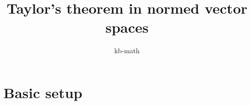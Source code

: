 \documentclass[twoside, a4paper, 10pt]{amsart}
\title[ ]{Taylor's theorem in normed vector spaces}
\author{kb-math}
\begin{document}
\maketitle
\raggedbottom

\tableofcontents


\newcommand{\cA}{\mathcal{A}}
\newcommand{\cB}{\mathcal{B}}
\newcommand{\cC}{\mathcal{C}}
\newcommand{\cD}{\mathcal{D}}
\newcommand{\cE}{\mathcal{E}}
\newcommand{\cF}{\mathcal{F}}
\newcommand{\cG}{\mathcal{G}}
\newcommand{\cH}{\mathcal{H}}
\newcommand{\cI}{\mathcal{I}}
\newcommand{\cJ}{\mathcal{J}}
\newcommand{\cK}{\mathcal{K}}
\newcommand{\cL}{\mathcal{L}}
\newcommand{\cM}{\mathcal{M}}
\newcommand{\cN}{\mathcal{N}}
\newcommand{\cO}{\mathcal{O}}
\newcommand{\cP}{\mathcal{P}}
\newcommand{\cQ}{\mathcal{Q}}
\newcommand{\cR}{\mathcal{R}}
\newcommand{\cS}{\mathcal{S}}
\newcommand{\cT}{\mathcal{T}}
\newcommand{\cU}{\mathcal{U}}
\newcommand{\cV}{\mathcal{V}}
\newcommand{\cW}{\mathcal{W}}
\newcommand{\cX}{\mathcal{X}}
\newcommand{\cY}{\mathcal{Y}}
\newcommand{\cZ}{\mathcal{Z}}
\newcommand{\bA}{\mathbb{A}}
\newcommand{\bB}{\mathbb{B}}
\newcommand{\bC}{\mathbb{C}}
\newcommand{\bD}{\mathbb{D}}
\newcommand{\bE}{\mathbb{E}}
\newcommand{\bF}{\mathbb{F}}
\newcommand{\bG}{\mathbb{G}}
\newcommand{\bH}{\mathbb{H}}
\newcommand{\bI}{\mathbb{I}}
\newcommand{\bJ}{\mathbb{J}}
\newcommand{\bK}{\mathbb{K}}
\newcommand{\bL}{\mathbb{L}}
\newcommand{\bM}{\mathbb{M}}
\newcommand{\bN}{\mathbb{N}}
\newcommand{\bO}{\mathbb{O}}
\newcommand{\bP}{\mathbb{P}}
\newcommand{\bQ}{\mathbb{Q}}
\newcommand{\bR}{\mathbb{R}}
\newcommand{\bS}{\mathbb{S}}
\newcommand{\bT}{\mathbb{T}}
\newcommand{\bU}{\mathbb{U}}
\newcommand{\bV}{\mathbb{V}}
\newcommand{\bW}{\mathbb{W}}
\newcommand{\bX}{\mathbb{X}}
\newcommand{\bY}{\mathbb{Y}}
\newcommand{\bZ}{\mathbb{Z}}


 

\theoremstyle{definition}
\newtheorem{mydef}[dummy]{Definition}
\newtheorem{prop}[dummy]{Proposition}
\newtheorem{corol}[dummy]{Corollary}
\newtheorem{thm}[dummy]{Theorem}
\newtheorem{lemma}[dummy]{Lemma}
\newtheorem{eg}[dummy]{Example}
\newtheorem{notation}[dummy]{Notation}
\newtheorem{remark}[dummy]{Remark}
\newtheorem{claim}[dummy]{Claim}
\newtheorem{Exercise}[dummy]{Exercise}
\newtheorem{question}[dummy]{Question}

\section{Basic setup}
\end{document}
